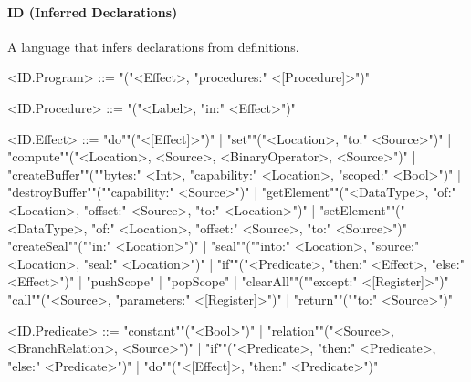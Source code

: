 \documentclass[main.tex]{subfiles}
\begin{document}
\paragraph{ ID (Inferred Declarations) } A language that infers declarations from definitions.
\begin{grammar}
	\footnotesize
				<ID.Program> ::=
							"("<Effect>, "procedures:" <[Procedure]>")"
				\par
				<ID.Procedure> ::=
							"("<Label>, "in:" <Effect>")"
				\par
				<ID.Effect> ::=
						"do""("<[Effect]>")"
						| "set""("<Location>, "to:" <Source>")"
						| "compute""("<Location>, <Source>, <BinaryOperator>, <Source>")"
						| "createBuffer""(""bytes:" <Int>, "capability:" <Location>, "scoped:" <Bool>")"
						| "destroyBuffer""(""capability:" <Source>")"
						| "getElement""("<DataType>, "of:" <Location>, "offset:" <Source>, "to:" <Location>")"
						| "setElement""("<DataType>, "of:" <Location>, "offset:" <Source>, "to:" <Source>")"
						| "createSeal""(""in:" <Location>")"
						| "seal""(""into:" <Location>, "source:" <Location>, "seal:" <Location>")"
						| "if""("<Predicate>, "then:" <Effect>, "else:" <Effect>")"
						| "pushScope"
						| "popScope"
						| "clearAll""(""except:" <[Register]>")"
						| "call""("<Source>, "parameters:" <[Register]>")"
						| "return""(""to:" <Source>")"
				\par
				<ID.Predicate> ::=
						"constant""("<Bool>")"
						| "relation""("<Source>, <BranchRelation>, <Source>")"
						| "if""("<Predicate>, "then:" <Predicate>, "else:" <Predicate>")"
						| "do""("<[Effect]>, "then:" <Predicate>")"
				\par
\end{grammar}
\par
\end{document}
